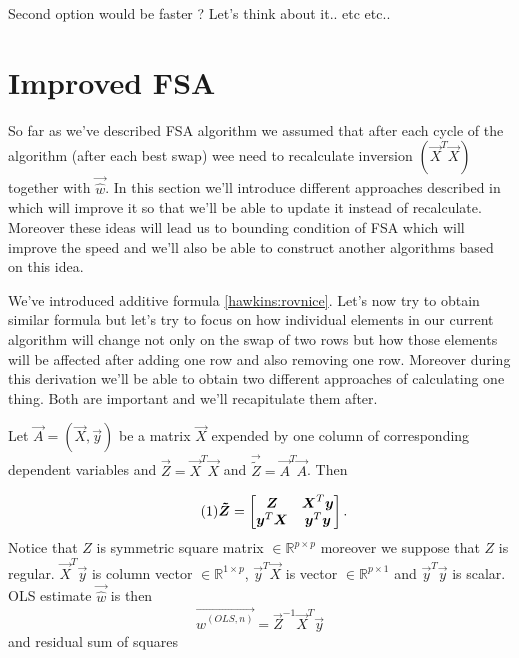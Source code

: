 Second option would be faster ? Let's think about it.. etc etc..

























\section{Improved FSA} %
So far as we've described FSA algorithm we assumed that after each cycle of the algorithm (after each best swap) wee need to recalculate inversion $(\vec{X}^T\vec{X})$ together with $\vec{\hat{w}}$. In this section we'll introduce different approaches described in \cite{agullo2001new} which will improve it so that we'll be able to update it instead of recalculate. Moreover these ideas will lead us to bounding condition of FSA which will improve the speed and we'll also be able to construct another algorithms based on this idea. 

We've introduced additive formula \ref{hawkins:rovnice}. Let's now try to obtain similar formula but let's try to focus on how individual elements in our current algorithm will change not only on the swap of two rows but how those elements will be affected after adding one row and also removing one row. Moreover during this derivation we'll be able to obtain two different approaches of calculating one thing. Both are important and we'll recapitulate them after.


Let $\vec{A} = (\vec{X}, \vec{y})$ be a matrix $\vec{X}$ expended by one column of corresponding dependent variables and $\vec{Z} = \vec{X}^T\vec{X}$ and $\vec{\tilde{Z}} = \vec{A}^T\vec{A}$. Then

\[  \numberthis \label{matrixZ}
	\vec{\tilde{Z}} = \begin{bmatrix}
		\vec{Z} & \vec{X}^T\vec{y} \\
    \vec{y}^T\vec{X} & \vec{y}^T\vec{y}
  \end{bmatrix} .
\]
Notice that $Z$ is symmetric square matrix $\in \mathbb{R}^ {p \times p}$ moreover we suppose that $Z$ is regular. $\vec{X}^T\vec{y}$ is column vector $\in \mathbb{R}^ {1 \times p}$, $\vec{y}^T\vec{X}$ is vector $\in \mathbb{R}^ {p \times 1}$ and $\vec{y}^T\vec{y}$ is scalar.
OLS estimate $\vec{\hat{w}}$ is then
\begin{equation}
	\vec{\hat{w}^{(OLS, n)}} = \vec{Z}^{-1} \vec{X}^T\vec{y}
\end{equation}
and residual sum of squares 

